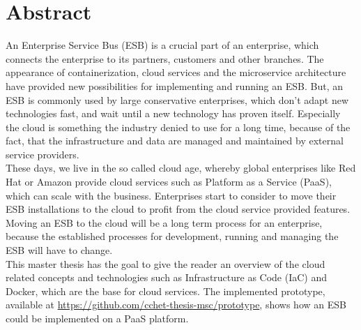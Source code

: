 \chapter{Abstract}
An Enterprise Service Bus (ESB) is a crucial part of an enterprise, which connects the enterprise to its partners, customers and other branches. The appearance of containerization, cloud services and the microservice architecture have provided new possibilities for implementing and running an ESB. But, an ESB is commonly used by large conservative enterprises, which don't adapt new technologies fast, and wait until a new technology has proven itself. Especially the cloud is something the industry denied to use for a long time, because of the fact, that the infrastructure and data are managed and maintained by external service providers. \\ 

These days, we live in the so called cloud age, whereby global enterprises like Red Hat or Amazon provide cloud services such as Platform as a Service (PaaS), which can scale with the business. Enterprises start to consider to move their ESB installations to the cloud to profit from the cloud service provided features. Moving an ESB to the cloud will be a long term process for an enterprise, because the established processes for development, running and managing the ESB will have to change. \\

This master thesis has the goal to give the reader an overview of the cloud related concepts and technologies such as Infrastructure as Code (IaC) and Docker, which are the base for cloud services. The implemented prototype, available at \url{https://github.com/cchet-thesis-msc/prototype}, shows how an ESB could be implemented on a PaaS platform. \\


